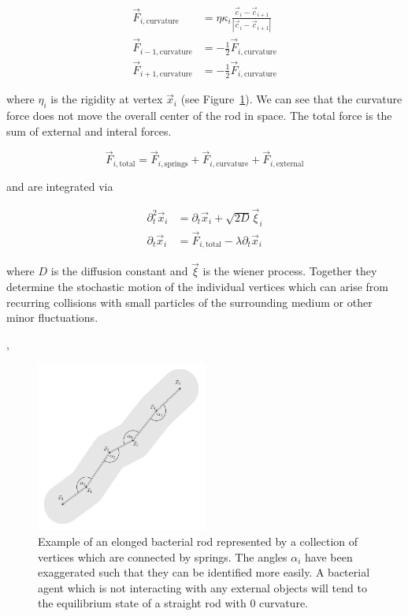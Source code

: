 \documentclass{article}
\begin{document}
\begin{align}
    \vec{F}_{i,\text{curvature}} &= \eta\kappa_i
        \frac{\vec{c}_i - \vec{c}_{i+1}}{|\vec{c}_i-\vec{c}_{i+1}|}\\
    \vec{F}_{i-1,\text{curvature}} &= -\frac{1}{2}\vec{F}_{i,\text{curvature}}\\
    \vec{F}_{i+1,\text{curvature}} &= -\frac{1}{2}\vec{F}_{i,\text{curvature}}
\end{align}

where $\eta_i$ is the rigidity at vertex $\vec{x}_i$ (see Figure~\ref{fig:mechanics-bacterium}).
We can see that the curvature force does not move the overall center of the rod in space.
The total force is the sum of external and interal forces.

\begin{equation}
    \vec{F}_{i,\text{total}} = \vec{F}_{i,\text{springs}}+ \vec{F}_{i,\text{curvature}}
        + \vec{F}_{i,\text{external}}
\end{equation}

and are integrated via

\begin{align}
    \partial_t^2 \vec{x}_i &= \partial_t\vec{x}_i + \sqrt{2D}\vec{\xi}_i\\
    \partial_t\vec{x}_i &= \vec{F}_{i,\text{total}} - \lambda \partial_t\vec{x}_i
\end{align}

where $D$ is the diffusion constant and $\vec{\xi}$ is the wiener process.
Together they determine the stochastic motion of the individual vertices which can arise from
recurring collisions with small particles of the surrounding medium or other minor fluctuations.

\cite{Chatterjee1988},\cite{Ursell2014}

\begin{figure}
    \centering
    \includegraphics[width=0.5\textwidth]{docs/source/_static/mechanics.png}
    \caption{
        Example of an elonged bacterial rod represented by a collection of vertices which are
        connected by springs.
        The angles $\alpha_i$ have been exaggerated such that they can be identified more easily.
        A bacterial agent which is not interacting with any external objects will tend to the
        equilibrium state of a straight rod with $0$ curvature.
    }
    \label{fig:mechanics-bacterium}
\end{figure}
\end{document}
